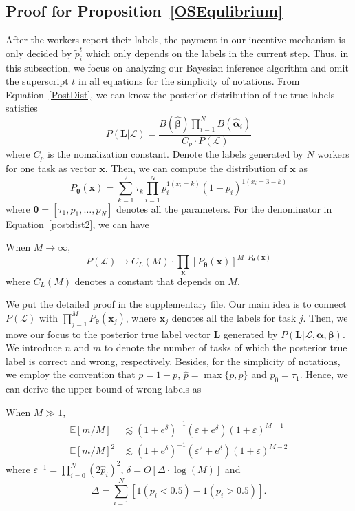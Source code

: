 \subsection{Proof for Proposition~\ref{OSEqulibrium}}
After the workers report their labels, the payment in our incentive mechanism is only decided by $\tilde{p}^t_i$ which only depends on the labels in the current step.
Thus, in this subsection, we focus on analyzing our Bayesian inference algorithm and omit the superscript $t$ in all equations for the simplicity of notations.
From Equation~\ref{PostDist}, we can know the posterior distribution of the true labels satisfies
\begin{equation}
\label{postdist2}
P(\bm{L}|\mathcal{L})=\frac{B(\hat{\bm{\beta}})\prod_{i=1}^{N}B(\hat{\bm{\alpha}}_{i})}{C_p\cdot P(\mathcal{L})}
\end{equation}
where $C_p$ is the nomalization constant.
Denote the labels generated by $N$ workers for one task as vector $\bm{x}$.
Then, we can compute the distribution of $\bm{x}$ as
\begin{equation}
P_{\bm{\theta}}(\bm{x}) = {\sum}_{k=1}^{2}\tau_k{\prod}_{i=1}^{N}p_i^{1(x_i=k)}(1-p_i)^{1(x_i=3-k)}
\end{equation}
where $\bm{\theta}=[\tau_1, p_1,\ldots,p_N]$ denotes all the parameters.
For the denominator in Equation~\ref{postdist2}, we can have
\begin{proposition}
\label{Denominator}
When $M\rightarrow \infty$, 
\begin{equation}
P(\mathcal{L})\rightarrow C_{L}(M) \cdot {\prod}_{\bm{x}} [P_{\bm{\theta}}(\bm{x})]^{M\cdot P_{\bm{\theta}}(\bm{x})}
\end{equation}
where $C_{L}(M)$ denotes a constant that depends on $M$.
\end{proposition}
We put the detailed proof in the supplementary file.
Our main idea is to connect $P(\mathcal{L})$ with ${\prod}_{j=1}^{M}P_{\bm{\theta}}(\bm{x}_j)$, where $\bm{x}_j$ denotes all the labels for task $j$.
Then, we move our focus to the posterior true label vector $\bm{L}$ generated by $P(\bm{L}|\mathcal{L},\bm{\alpha}, \bm{\beta})$.
We introduce $n$ and $m$ to denote the number of tasks of which the posterior true label is correct and wrong, respectively.
Besides, for the simplicity of notations, we employ the convention that $\bar{p}=1-p$, $\hat{p}=\max \{p, \bar{p}\}$ and $p_0=\tau_1$. Hence, we can derive the upper bound of wrong labels as
\begin{proposition}
\label{ConvBound}
When $M\gg 1$,
\begin{align}
\mathbb{E}[m/M]&\lesssim (1+e^{\delta})^{-1}(\varepsilon+e^{\delta})(1+\varepsilon)^{M-1}\\
\mathbb{E}[m/M]^2&\lesssim (1+e^{\delta})^{-1}(\varepsilon^2+e^{\delta})(1+\varepsilon)^{M-2}
\end{align}
where $\varepsilon^{-1}=\prod_{i=0}^{N}(2\hat{p}_i)^{2}$, $\delta=O[\Delta\cdot \log(M)]$ and 
$$\Delta={\sum}_{i=1}^N[1(p_i<0.5)-1(p_i>0.5)].$$
\end{proposition}
